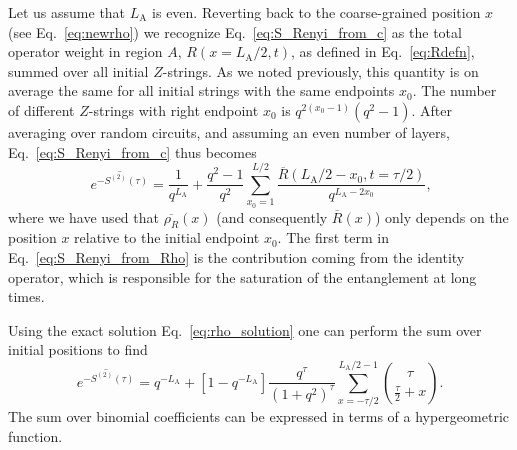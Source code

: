 \documentclass[aps,prb,twocolumn,superscriptaddress]{revtex4-1}
\begin{document}
Let us assume that $L_\text{A}$ is even. Reverting back to the coarse-grained position $x$ (see Eq.~\eqref{eq:newrho}) we recognize Eq.~\eqref{eq:S_Renyi_from_c} as the total operator weight in region $A$, $R(x=L_{\text{A}}/2,t)$, as defined in Eq.~\eqref{eq:Rdefn}, summed over all initial $Z$-strings. As we noted previously, this quantity is on average the same for all initial strings with the same endpoints $x_0$. The number of different $Z$-strings with right endpoint $x_0$ is $q^{2(x_0-1)} (q^2-1)$. After averaging over random circuits, and assuming an even number of layers, Eq.~\eqref{eq:S_Renyi_from_c} thus becomes
\begin{equation}~\label{eq:S_Renyi_from_Rho}
\overline{e^{-S^{(2)}(\tau)}} = \frac{1}{q^{L_\text{A}}} + \frac{q^2-1}{q^2}\sum_{x_0 = 1}^{L/2} \frac{\overline{R}(L_\text{A}/2-x_0,t=\tau/2)}{q^{L_\text{A}-2x_0}},
\end{equation} 
where we have used that $\overline{\rho_R}(x)$ (and consequently $\overline{R}(x)$) only depends on the position $x$ relative to the initial endpoint $x_0$. The first term in Eq.~\eqref{eq:S_Renyi_from_Rho} is the contribution coming from the identity operator, which is responsible for the saturation of the entanglement at long times.

Using the exact solution Eq.~\eqref{eq:rho_solution} one can perform the sum over initial positions to find
\begin{equation}\label{eq:S_Renyi_exact}
\overline{e^{-S^{(2)}(\tau)}} = q^{-L_\text{A}} + [1 - q^{-L_\text{A}}] \frac{q^\tau}{\left(1+q^2\right)^\tau} \sum_{x=-\tau/2}^{L_\text{A}/2 -1} {\tau \choose \frac{\tau}{2} + x}.
\end{equation}
The sum over binomial coefficients can be expressed in terms of a hypergeometric function.
\end{document}
